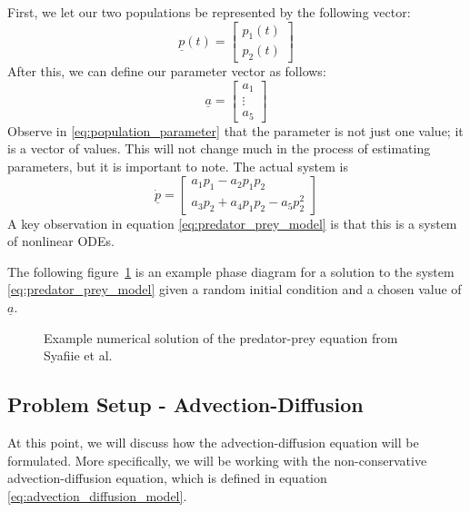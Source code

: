 \documentclass{article}
\begin{document}
First, we let our two populations be represented by the following vector:
\begin{equation}
    \underline{p}(t) = \begin{bmatrix}
        p_1(t)\\
        p_2(t)
    \end{bmatrix}
    \label{eq:population_variable}
\end{equation}
After this, we can define our parameter vector as follows:
\begin{equation}
    \underline{a} = \begin{bmatrix}
        a_1\\
        \vdots\\
        a_5
    \end{bmatrix}
    \label{eq:population_parameter}
\end{equation}
Observe in \eqref{eq:population_parameter} that the parameter is not just one value; it is a vector of values. This will not change much in the process of estimating parameters, but it is important to note. The actual system is
\begin{equation}
    \dot{\underline{p}} = \begin{bmatrix}
        a_1p_1 - a_2 p_1 p_2\\
        a_3p_2+a_4p_1p_2 - a_5 p_2^2
    \end{bmatrix}
    \label{eq:predator_prey_model}
\end{equation}
A key observation in equation \eqref{eq:predator_prey_model} is that this is a system of nonlinear ODEs.

The following figure~\ref{fig:predator_prey_example} is an example phase diagram for a solution to the system \eqref{eq:predator_prey_model} given a random initial condition and a chosen value of $\underline{a}$.

\begin{figure}[htbp]
    \centering
    
    \caption{Example numerical solution of the predator-prey equation from Syafiie et al.~\cite{syafiie2025systems}}
    \label{fig:predator_prey_example}
\end{figure}

\subsection{Problem Setup - Advection-Diffusion}

At this point, we will discuss how the advection-diffusion equation will be formulated. More specifically, we will be working with the non-conservative advection-diffusion equation, which is defined in equation \eqref{eq:advection_diffusion_model}.
\end{document}
